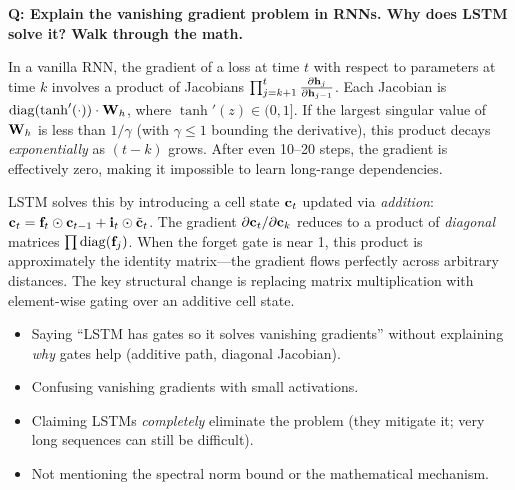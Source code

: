 \begin{interviewq}
\textbf{Q: Explain the vanishing gradient problem in RNNs. Why does LSTM
solve it? Walk through the math.}

 \quad {} \quad
\badgefreq{\freqhigh}

\stronganswer
In a vanilla RNN, the gradient of a loss at time $t$ with respect to
parameters at time $k$ involves a product of Jacobians
$\prod_{j=k+1}^{t} \frac{\partial \mathbf{h}_j}{\partial \mathbf{h}_{j-1}}$.
Each Jacobian is
$\operatorname{diag}(\tanh'(\cdot)) \cdot \mathbf{W}_h$,
where $\tanh'(z) \in (0, 1]$.  If the largest singular value of $\mathbf{W}_h$
is less than $1/\gamma$ (with $\gamma \leq 1$ bounding the derivative),
this product decays \emph{exponentially} as $(t - k)$ grows.  After even 10--20
steps, the gradient is effectively zero, making it impossible to learn
long-range dependencies.

LSTM solves this by introducing a cell state $\mathbf{c}_t$ updated via
\emph{addition}: $\mathbf{c}_t = \mathbf{f}_t \odot \mathbf{c}_{t-1} +
\mathbf{i}_t \odot \tilde{\mathbf{c}}_t$.  The gradient
$\partial \mathbf{c}_t / \partial \mathbf{c}_k$ reduces to a product of
\emph{diagonal} matrices $\prod \operatorname{diag}(\mathbf{f}_j)$.  When the forget
gate is near 1, this product is approximately the identity matrix---the
gradient flows perfectly across arbitrary distances.  The key structural
change is replacing matrix multiplication with element-wise gating over
an additive cell state.

\redflags
\begin{itemize}
\item Saying ``LSTM has gates so it solves vanishing gradients'' without
  explaining \emph{why} gates help (additive path, diagonal Jacobian).
\item Confusing vanishing gradients with small activations.
\item Claiming LSTMs \emph{completely} eliminate the problem (they
  mitigate it; very long sequences can still be difficult).
\item Not mentioning the spectral norm bound or the mathematical mechanism.
\end{itemize}



\end{interviewq}
